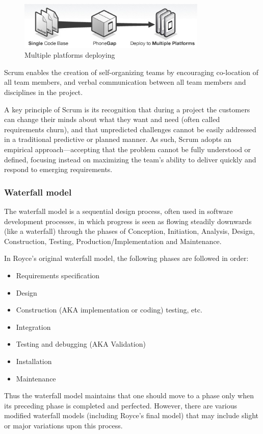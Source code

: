 	\begin{figure}[phonegap]
		\centering
		\includegraphics[width=0.8\textwidth]{prestudy/development_environment/PhoneGap.jpg}
		\caption{Multiple platforms deploying}
		\label{fig:usecase}
	\end{figure}
	
	Scrum enables the creation of self-organizing teams by encouraging co-location of all team members, and verbal communication between all team members and disciplines in the project.\newline
	
	A key principle of Scrum is its recognition that during a project the customers can change their minds about what they want and need (often called requirements churn), and that unpredicted challenges cannot be easily addressed in a traditional predictive or planned manner. As such, Scrum adopts an empirical approach—accepting that the problem cannot be fully understood or defined, focusing instead on maximizing the team’s ability to deliver quickly and respond to emerging requirements.\newline

	\subsubsection{Waterfall model}
	The waterfall model is a sequential design process, often used in software development processes, in which progress is seen as flowing steadily downwards (like a waterfall) through the phases of Conception, Initiation, Analysis, Design, Construction, Testing, Production/Implementation and Maintenance.\newline
	
	In Royce's original waterfall model, the following phases are followed in order:
	
	\begin{itemize}
		\item Requirements specification
		\item Design
		\item Construction (AKA implementation or coding) testing, etc.
		\item Integration
		\item Testing and debugging (AKA Validation)
		\item Installation
		\item Maintenance
	\end{itemize}
	
	Thus the waterfall model maintains that one should move to a phase only when its preceding phase is completed and perfected. However, there are various modified waterfall models (including Royce's final model) that may include slight or major variations upon this process.